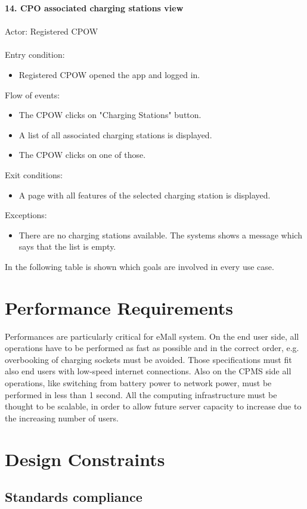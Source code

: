 \documentclass[a4paper]{report}
\begin{document}
\textbf{14. CPO associated charging stations view}\label{uc:8}
\\ \\
Actor: Registered CPOW \\ \\
Entry condition: 
\begin{itemize}
\item Registered CPOW opened the app and logged in.
\end{itemize}
Flow of events:
\begin{itemize}
\item The CPOW clicks on "Charging Stations" button.
\item A list of all associated charging stations is displayed.
\item The CPOW clicks on one of those.
\end{itemize}
Exit conditions: 
\begin{itemize}
\item A page with all features of the selected charging station is displayed.
\end{itemize} 
Exceptions: 
\begin{itemize}
\item There are no charging stations available. The systems shows a message which says that the list is empty.
\end{itemize}
In the following table is shown which goals are involved in every use case.

\section{Performance Requirements}
Performances are particularly critical for eMall system. On the end user side, all operations have to be performed as fast as possible and in the correct order, e.g. overbooking of charging sockets must be avoided. Those specifications must fit also end users with low-speed internet connections. Also on the CPMS side all operations, like switching from battery power to network power, must be performed in less than 1 second. All the computing infrastructure must be thought to be scalable, in order to allow future server capacity to increase due to the increasing number of users.

\section{Design Constraints}
\subsection{Standards compliance}
\end{document}
